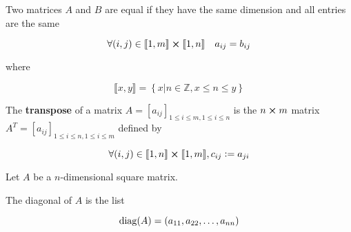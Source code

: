 \begin{definition}[Equality]
	Two matrices $A$ and $B$ are equal if they have the same dimension and all entries are the same

	\[\forall(i, j) \in \llbracket 1, m \rrbracket \cross \llbracket 1, n \rrbracket \quad a_{ij} = b_{ij}\]

	where

	\[\llbracket x, y \rrbracket = \left\{x \vert n \in \mathbb{Z}, x \leq n \leq y\right\}\]
\end{definition}

\begin{definition}[Transpose]
	The \textbf{transpose} of a matrix $A = \left[a_{ij}\right]_{1 \leq i \leq m, 1 \leq i \leq n}$ is the $n \cross m$ matrix $A^T = \left[a_{ij}\right]_{1 \leq i \leq n, 1 \leq i \leq m}$ defined by

	\[\forall (i, j) \in \llbracket 1, n \rrbracket \cross \llbracket 1, m \rrbracket, c_{ij} := a_{ji}\]
\end{definition}

\begin{definition}[Diagonal]
	Let $A$ be a $n$-dimensional square matrix.

	The diagonal of $A$ is the list

	\[\mathrm{diag}(A) = (a_{11}, a_{22}, \ldots, a_{nn})\]
\end{definition}